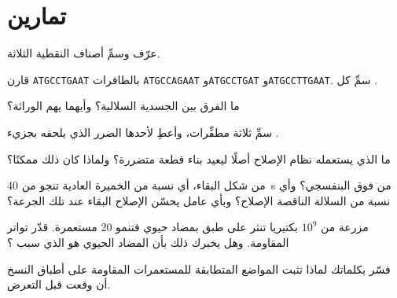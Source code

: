 \section{تمارين}

\begin{exercise}[$\star$]\label{exo:g11:mutations:1}
عرّف  وسمِّ أصناف  النقطية الثلاثة.
\end{exercise}

\begin{exercise}[$\star$]\label{exo:g11:mutations:2}
قارن \texttt{ATGCCTGAAT} بالطافرات \texttt{ATGCCAGAAT}
و\texttt{ATGCCTGAT} و\texttt{ATGCCTTGAAT}. سمِّ كل .
\end{exercise}

\begin{exercise}[$\star$]\label{exo:g11:mutations:3}
ما الفرق بين  الجسدية  السلالية؟ وأيهما يهم الوراثة؟
\end{exercise}

\begin{exercise}[$\star$]\label{exo:g11:mutations:4}
سمِّ ثلاثة مطفِّرات، وأعطِ لأحدها الضرر الذي يلحقه بجزيء .
\end{exercise}

\begin{exercise}[$\star$]\label{exo:g11:mutations:5}
ما الذي يستعمله نظام الإصلاح أصلًا ليعيد بناء قطعة متضررة؟ ولماذا كان
ذلك ممكنًا؟
\end{exercise}

\begin{exercise}[$\star\star$]\label{exo:g11:mutations:6}
من شكل البقاء، أي نسبة من الخميرة العادية تنجو من \qty{40}{s} من فوق
البنفسجي؟ وأي نسبة من السلالة الناقصة الإصلاح؟ وبأي عامل يحسّن الإصلاح
البقاء عند تلك الجرعة؟
\end{exercise}

\begin{exercise}[$\star\star$]\label{exo:g11:mutations:7}
مزرعة من $10^9$ بكتيريا تنثر على طبق بمضاد حيوي فتنمو 20 مستعمرة.
قدّر تواتر  المقاومة. وهل يخبرك ذلك بأن المضاد الحيوي هو الذي
سبب ؟
\end{exercise}

\begin{exercise}[$\star\star$]\label{exo:g11:mutations:8}
فسّر بكلماتك لماذا تثبت المواضع المتطابقة للمستعمرات المقاومة على
أطباق النسخ أن  وقعت قبل التعرض.
\end{exercise}

